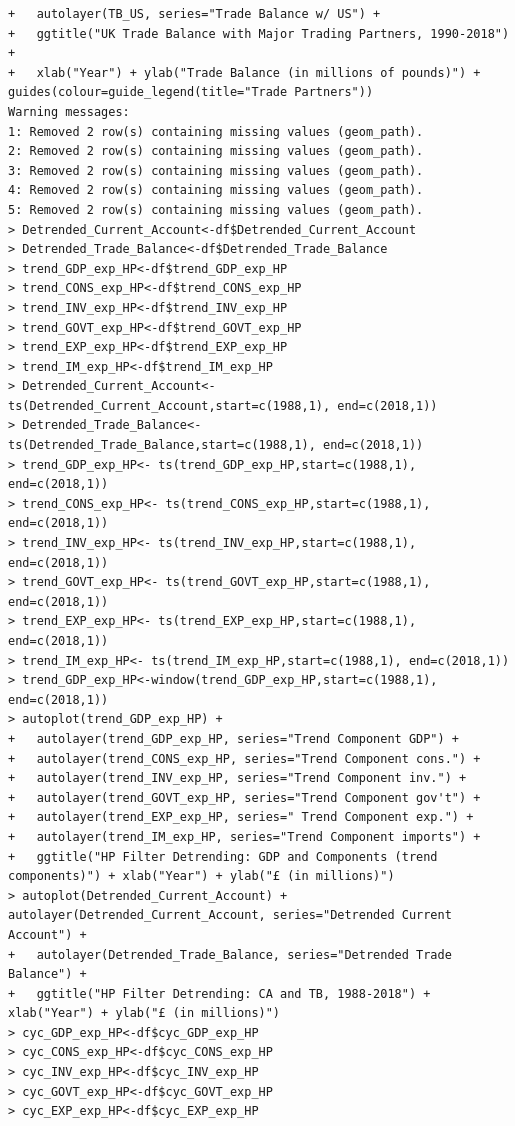 \documentclass[12pt]{article}
\begin{document}
\begin{verbatim}
+   autolayer(TB_US, series="Trade Balance w/ US") +
+   ggtitle("UK Trade Balance with Major Trading Partners, 1990-2018") + 
+   xlab("Year") + ylab("Trade Balance (in millions of pounds)") + guides(colour=guide_legend(title="Trade Partners"))
Warning messages:
1: Removed 2 row(s) containing missing values (geom_path). 
2: Removed 2 row(s) containing missing values (geom_path). 
3: Removed 2 row(s) containing missing values (geom_path). 
4: Removed 2 row(s) containing missing values (geom_path). 
5: Removed 2 row(s) containing missing values (geom_path). 
> Detrended_Current_Account<-df$Detrended_Current_Account
> Detrended_Trade_Balance<-df$Detrended_Trade_Balance
> trend_GDP_exp_HP<-df$trend_GDP_exp_HP
> trend_CONS_exp_HP<-df$trend_CONS_exp_HP
> trend_INV_exp_HP<-df$trend_INV_exp_HP
> trend_GOVT_exp_HP<-df$trend_GOVT_exp_HP
> trend_EXP_exp_HP<-df$trend_EXP_exp_HP	
> trend_IM_exp_HP<-df$trend_IM_exp_HP
> Detrended_Current_Account<- ts(Detrended_Current_Account,start=c(1988,1), end=c(2018,1))
> Detrended_Trade_Balance<- ts(Detrended_Trade_Balance,start=c(1988,1), end=c(2018,1))
> trend_GDP_exp_HP<- ts(trend_GDP_exp_HP,start=c(1988,1), end=c(2018,1))
> trend_CONS_exp_HP<- ts(trend_CONS_exp_HP,start=c(1988,1), end=c(2018,1))
> trend_INV_exp_HP<- ts(trend_INV_exp_HP,start=c(1988,1), end=c(2018,1))
> trend_GOVT_exp_HP<- ts(trend_GOVT_exp_HP,start=c(1988,1), end=c(2018,1))
> trend_EXP_exp_HP<- ts(trend_EXP_exp_HP,start=c(1988,1), end=c(2018,1))
> trend_IM_exp_HP<- ts(trend_IM_exp_HP,start=c(1988,1), end=c(2018,1))
> trend_GDP_exp_HP<-window(trend_GDP_exp_HP,start=c(1988,1), end=c(2018,1)) 
> autoplot(trend_GDP_exp_HP) +
+   autolayer(trend_GDP_exp_HP, series="Trend Component GDP") +
+   autolayer(trend_CONS_exp_HP, series="Trend Component cons.") +
+   autolayer(trend_INV_exp_HP, series="Trend Component inv.") +
+   autolayer(trend_GOVT_exp_HP, series="Trend Component gov't") +
+   autolayer(trend_EXP_exp_HP, series=" Trend Component exp.") +
+   autolayer(trend_IM_exp_HP, series="Trend Component imports") +
+   ggtitle("HP Filter Detrending: GDP and Components (trend components)") + xlab("Year") + ylab("£ (in millions)")
> autoplot(Detrended_Current_Account) + autolayer(Detrended_Current_Account, series="Detrended Current Account") +
+   autolayer(Detrended_Trade_Balance, series="Detrended Trade Balance") +
+   ggtitle("HP Filter Detrending: CA and TB, 1988-2018") + xlab("Year") + ylab("£ (in millions)")
> cyc_GDP_exp_HP<-df$cyc_GDP_exp_HP
> cyc_CONS_exp_HP<-df$cyc_CONS_exp_HP
> cyc_INV_exp_HP<-df$cyc_INV_exp_HP
> cyc_GOVT_exp_HP<-df$cyc_GOVT_exp_HP
> cyc_EXP_exp_HP<-df$cyc_EXP_exp_HP

\end{verbatim}
\end{document}
